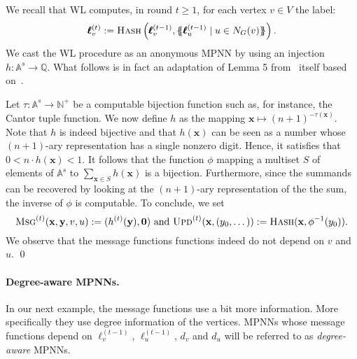 \begin{example}\label{ex:WL}
We recall that WL computes, in round $t \geq 1$, for each vertex $v\in V$ the label:
$$
\pmb{\ell}^{(t)}_v:=\textsc{Hash}\left(\pmb{\ell}^{(t-1)}_v,\{\!\!\{ \pmb{\ell}_u^{(t-1)} \mathrel{\mid} u \in N_G(v) \}\!\!\}\right).
$$
We cast the WL procedure as an anonymous MPNN by using an injection
$h : \mathbb{A}^s \to \mathbb{Q}$. What follows is in fact an
adaptation of Lemma 5 from~\cite{xhlj19} itself based on~\cite[Theorem
2]{ZaheerKRPSS17}.

Let $\tau : \mathbb{A}^s \to \mathbb{N}^+$ be a computable bijection function
such as, for instance, the Cantor tuple function. We now define $h$ as the
mapping $\mathbf{x} \mapsto (n+1)^{-\tau(\mathbf{x})}$. Note that $h$ is
indeed bijective and that $h(\mathbf{x})$ can be seen as a number whose
$(n+1)$-ary representation has a single nonzero digit. Hence, it satisfies
that $0 < n \cdot h(\mathbf{x}) < 1$. It follows that the function $\phi$
mapping a multiset $S$ of elements of $\mathbb{A}^s$ to $\sum_{\mathbf{x} \in
S} h(\mathbf{x})$ is a bijection. Furthermore, since the summands can be
recovered by looking at the $(n+1)$-ary representation of the the sum, the
inverse of $\phi$ is computable. To conclude, we set 
\[
\textsc{Msg}^{(t)}(\mathbf{x},\mathbf{y},v,u) :=
(h^{(t)}(\mathbf{y}),\mathbf{0}) \text{ and }
\textsc{Upd}^{(t)}(\mathbf{x},(y_0,\dots)) :=
\textsc{Hash}(\mathbf{x},\phi^{-1}(y_0)).
\]
We observe that the message functions functions indeed do not depend on $v$
and $u$.
\qed
 \end{example}

\paragraph{Degree-aware MPNNs.} In our next example, the message functions use a bit more information. More specifically they use  degree information of the vertices.
MPNNs whose message functions depend on 
 $\pmb{\ell}_v^{(t-1)}$, $\pmb{\ell}_u^{(t-1)}$, $d_v$ and $d_u$ will be referred to as \textit{degree-aware} MPNNs. 

